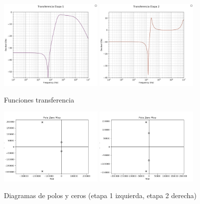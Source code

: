 \documentclass[spanish]{article}
\begin{document}
\begin{figure}[H]
\begin{centering}
\includegraphics[width=0.45\textwidth]{Resources/bodeetapa1.png}
\includegraphics[width=0.45\textwidth]{Resources/bodeetapa2.png}
\par\end{centering}
\caption{Funciones transferencia}
\label{bodeetapas}
\end{figure}

\begin{figure}[H]
\begin{centering}
\includegraphics[width=0.45\textwidth]{Resources/polosetapa1.png}
\includegraphics[width=0.45\textwidth]{Resources/polosetapa2.png}
\par\end{centering}
\caption{Diagramas de polos y ceros (etapa 1 izquierda, etapa 2 derecha)}
\label{polosetapas}
\end{figure}
\end{document}
